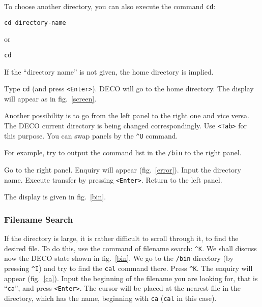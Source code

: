 
To choose another directory, you can also execute the command {\tt cd}:
\begin{source}
\begin{verbatim}
cd directory-name
\end{verbatim}
\end{source}
or
\begin{source}
\begin{verbatim}
cd
\end{verbatim}
\end{source}
If the ``directory name'' is not given, the home directory
is implied. 

Type {\tt cd} (and press {\tt <Enter>}). DECO will go to the home
directory. The display will appear as in fig.~\ref{screen}.

Another possibility is to go from the left panel to the
right one and vice versa. The DECO current directory is 
being changed correspondingly. Use {\tt <Tab>} for this
purpose. You can swap panels by the {\tt \^{}U} command.

For example, try to output the command list in the {\tt /bin}
to the right panel.

\begin{example}
Go to the right panel.
Enquiry will appear (fig.~\ref{error}).
Input the directory name.
Execute transfer by pressing {\tt <Enter>}.
Return to the left panel.
\end{example}

The display is given in fig.~\ref{bin}.
 

\subsubsection{Filename Search}

If the directory is large, it is rather difficult to scroll 
through it, to find the desired file. To do this, use the 
command of filename search: {\tt \^{}K}. We shall discuss now the
DECO state shown in fig.~\ref{bin}. We go to the {\tt /bin}
directory (by pressing {\tt \^{}I}) and try to find the {\tt cal}
command there. Press {\tt \^{}K}. The enquiry will appear (fig.~\ref{ca}).
Input the beginning of the filename you are looking for, that is ``{\tt ca}'',
and press {\tt <Enter>}. The cursor will be placed at the nearest file in
the directory, which has the name, beginning with {\tt ca} ({\tt cal} in
this case).


